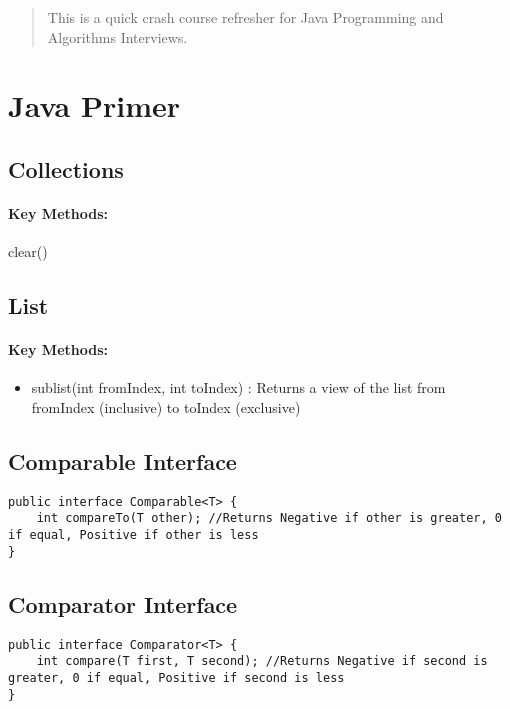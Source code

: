 \documentclass[12pt]{article}
\begin{document}
\maketitle

\begin{abstract}
This is a quick crash course refresher for Java Programming and Algorithms Interviews.
\end{abstract}

\section{Java Primer}

\subsection{Collections}

\paragraph{Key Methods:} clear()

\subsection{List}

\paragraph{Key Methods:} 
\begin{itemize}
	\item sublist(int fromIndex, int toIndex) : Returns a view of the list from fromIndex (inclusive) to toIndex (exclusive)
\end{itemize}

\subsection{Comparable Interface}
\begin{lstlisting}
public interface Comparable<T> {
	int compareTo(T other); //Returns Negative if other is greater, 0 if equal, Positive if other is less
}
\end{lstlisting}

\subsection{Comparator Interface}
\begin{lstlisting}
public interface Comparator<T> {
	int compare(T first, T second); //Returns Negative if second is greater, 0 if equal, Positive if second is less
}
\end{lstlisting}
\end{document}
